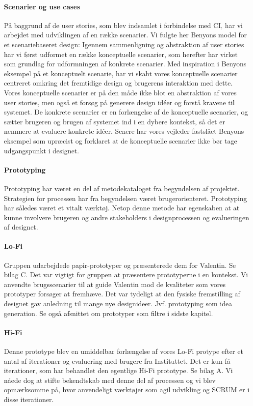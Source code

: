 \paragraph{Scenarier og use cases}
På baggrund af de user stories, som blev indsamlet i forbindelse med CI, har vi arbejdet med udviklingen af en række scenarier. Vi fulgte her Benyons model for et scenariebaseret design: Igennem sammenligning og abstraktion af user stories har vi først udformet en række konceptuelle scenarier, som herefter har virket som grundlag for udformningen af konkrete scenarier.
Med inspiration i Benyons eksempel på et konceptuelt scenarie, har vi skabt vores konceptuelle scenarier centreret omkring det fremtidige design og brugerens interaktion med dette. Vores konceptuelle scenarier er på den måde ikke blot en abstraktion af vores user stories, men også et forsøg på generere design idéer og forstå kravene til systemet. De konkrete scenarier er en forlængelse af de konceptuelle scenarier, og sætter brugeren og brugen af systemet ind i en dybere kontekst, så det er nemmere at evaluere konkrete idéer. 
Senere har vores vejleder fastslået Benyons eksempel som upræcist og forklaret at de konceptuelle scenarier ikke bør tage udgangspunkt i designet. 

\paragraph{Prototyping}
Prototyping har været en del af metodekataloget fra begyndelsen af projektet. Strategien for processen har fra begyndelsen været brugerorienteret. Prototyping har således været et vitalt værktøj. Netop denne metode har egenskaben at at kunne involvere brugeren og andre stakeholders i designprocessen og evalueringen af designet. 

\paragraph{Lo-Fi}
Gruppen udarbejdede papir-prototyper og præsenterede dem for Valentin. Se bilag C. Det var vigtigt for gruppen at præsentere prototyperne i en kontekst. Vi anvendte brugsscenarier til at guide Valentin mod de kvaliteter som vores prototyper forsøger at fremhæve. Det var tydeligt at den fysiske fremstilling af designet gav anledning til mange nye designideer. Jvf. prototyping som idea generation. Se også afsnittet om prototyper som filtre i sidste kapitel.

\paragraph{Hi-Fi}
Denne prototype blev en umiddelbar forlængelse af vores Lo-Fi protype efter et antal af iterationer og evaluering med brugere fra Instituttet.
Det er kun få iterationer, som har behandlet den egentlige Hi-Fi prototype. Se bilag A. Vi nåede dog at stifte bekendtskab med denne del af processen og vi blev opmærksomme på, hvor anvendeligt værktøjer som agil udvikling og SCRUM er i disse iterationer.

